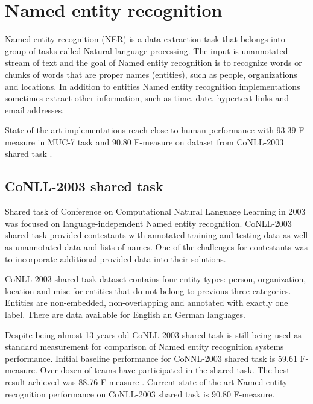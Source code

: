 \documentclass[thesis=B,english]{FITthesis}[2012/10/20]
\begin{document}
\section{Named entity recognition}
Named entity recognition (NER) is a data extraction task that belongs into group of tasks called Natural language processing. The input is unannotated stream of text and the goal of Named entity recognition is to recognize words or chunks of words that are proper names (entities), such as people, organizations and locations. In addition to entities Named entity recognition implementations sometimes extract other information, such as time, date, hypertext links and email addresses.

\par State of the art implementations reach close to human performance with 93.39 F-measure in MUC-7 \cite{muc7} task and 90.80 F-measure on dataset from CoNLL-2003 shared task \cite{stateOfTheArtConll} \cite{conll2003task}.

\subsection{CoNLL-2003 shared task}
Shared task of Conference on Computational Natural Language Learning in 2003 \cite{conll2003} was focused on language-independent Named entity recognition. CoNLL-2003 shared task provided contestants with annotated training and testing data as well as unannotated data and lists of names. One of the challenges for contestants was to incorporate additional provided data into their solutions. 
\par CoNLL-2003 shared task dataset contains four entity types: person, organization, location and misc for entities that do not belong to previous three categories. Entities are non-embedded, non-overlapping and annotated with exactly one label. \cite{stateOfTheArtCzechNER} There are data available for English an German languages. \cite{conll2003task}
\par Despite being almost 13 years old CoNLL-2003 shared task is still being used as standard measurement for comparison of Named entity recognition systems performance. \cite{stateOfTheArtCzechNER} \cite{strakova2017neural} \cite{stateOfTheArtConll} Initial baseline performance for CoNNL-2003 shared task is 59.61 F-measure. Over dozen of teams have participated in the shared task. The best result achieved was 88.76 F-measure \cite{florian2003conll}. Current state of the art Named entity recognition performance on CoNLL-2003 shared task is 90.80 F-measure. \cite{stateOfTheArtConll}
\end{document}
